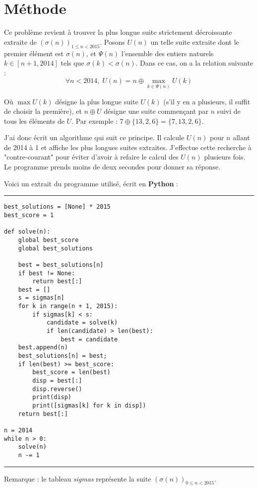 \documentclass[10pt,a4paper,twocolumn]{article}
\begin{document}
\section{Méthode}

Ce problème revient à trouver la plus longue suite strictement décroissante extraite de $\left(\sigma(n)\right)_{1\leq n < 2015}$.
Posons $U(n)$ un telle suite extraite dont le premier élément est $\sigma(n)$, et $\Psi(n)$ l'ensemble des entiers naturels $k \in [n+1,2014]$ tels que $\sigma(k) < \sigma(n)$. Dans ce cas, on a la relation suivante :
$$\forall n < 2014, \; U(n) = n \oplus \max_{k \in \Psi(n)}U(k)$$

Où $\max U(k)$ désigne la plus longue suite $U(k)$ (s'il y en a plusieurs, il suffit de choisir la première), et $n\oplus U$ désigne une suite commençant par $n$ suivi de tous les éléments de $U$. Par exemple : $7 \oplus \{13, 2, 6\} = \{7,13,2,6\}$.

J'ai donc écrit un algorithme qui suit ce principe. Il calcule $U(n)$ pour $n$ allant de 2014 à 1 et affiche les plus longues suites extraites. J'effectue cette recherche à "contre-courant" pour éviter d'avoir à refaire le calcul des $U(n)$ plusieurs fois. Le programme prends moins de deux secondes pour donner sa réponse.

Voici un extrait du programme utilisé, écrit en {\bf Python} :

\vspace{8pt}\hrule
\begin{lstlisting}
best_solutions = [None] * 2015
best_score = 1

def solve(n):
    global best_score
    global best_solutions

    best = best_solutions[n]
    if best != None:
        return best[:]
    best = []
    s = sigmas[n]
    for k in range(n + 1, 2015):
        if sigmas[k] < s:
            candidate = solve(k)
            if len(candidate) > len(best):
                best = candidate
    best.append(n)
    best_solutions[n] = best;
    if len(best) >= best_score:
        best_score = len(best)
        disp = best[:]
        disp.reverse()
        print(disp)
        print([sigmas[k] for k in disp])
    return best[:]

n = 2014
while n > 0:
    solve(n)
    n -= 1
\end{lstlisting}
\hrule\vspace{8pt}

Remarque : le tableau \emph{sigmas} représente la suite $\left(\sigma(n)\right)_{0\leq n < 2015}$. 
\end{document}

